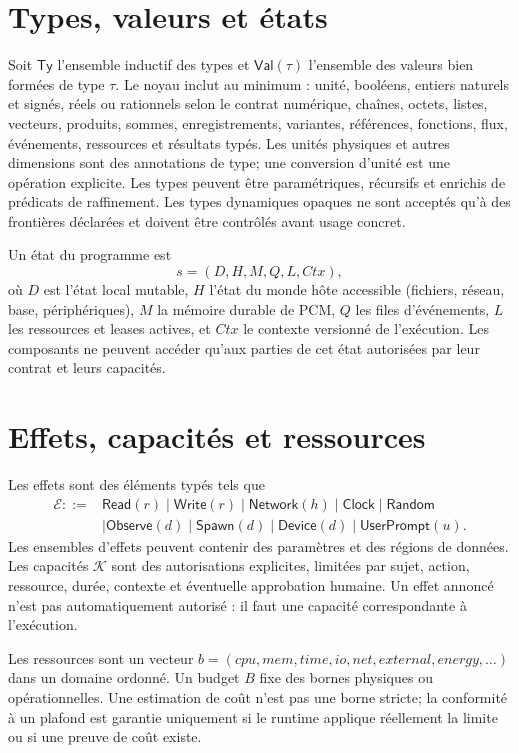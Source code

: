 \documentclass[11pt,a4paper,openany]{book}
\newcommand{\Eff}{\mathcal{E}}
\newcommand{\Capabilities}{\mathcal{K}}
\theoremstyle{definition}
\theoremstyle{plain}
\theoremstyle{remark}
\begin{document}
\section{Types, valeurs et états}
Soit $\mathsf{Ty}$ l'ensemble inductif des types et $\mathsf{Val}(\tau)$ l'ensemble des valeurs bien formées de type $\tau$. Le noyau inclut au minimum : unité, booléens, entiers naturels et signés, réels ou rationnels selon le contrat numérique, chaînes, octets, listes, vecteurs, produits, sommes, enregistrements, variantes, références, fonctions, flux, événements, ressources et résultats typés. Les unités physiques et autres dimensions sont des annotations de type; une conversion d'unité est une opération explicite. Les types peuvent être paramétriques, récursifs et enrichis de prédicats de raffinement. Les types dynamiques opaques ne sont acceptés qu'à des frontières déclarées et doivent être contrôlés avant usage concret.

Un état du programme est
\[
s=(D,H,M,Q,L,Ctx),
\]
où $D$ est l'état local mutable, $H$ l'état du monde hôte accessible (fichiers, réseau, base, périphériques), $M$ la mémoire durable de PCM, $Q$ les files d'événements, $L$ les ressources et leases actives, et $Ctx$ le contexte versionné de l'exécution. Les composants ne peuvent accéder qu'aux parties de cet état autorisées par leur contrat et leurs capacités.

\section{Effets, capacités et ressources}
Les effets sont des éléments typés tels que
\[\begin{aligned}
\Eff ::= {}&\mathsf{Read}(r)\mid\mathsf{Write}(r)\mid\mathsf{Network}(h)\mid\mathsf{Clock}\mid\mathsf{Random}\\
&\mid\mathsf{Observe}(d)\mid\mathsf{Spawn}(d)\mid\mathsf{Device}(d)\mid\mathsf{UserPrompt}(u).
\end{aligned}\]
Les ensembles d'effets peuvent contenir des paramètres et des régions de données. Les capacités $\Capabilities$ sont des autorisations explicites, limitées par sujet, action, ressource, durée, contexte et éventuelle approbation humaine. Un effet annoncé n'est pas automatiquement autorisé : il faut une capacité correspondante à l'exécution.

Les ressources sont un vecteur $b=(cpu,mem,time,io,net,external,energy,\ldots)$ dans un domaine ordonné. Un budget $B$ fixe des bornes physiques ou opérationnelles. Une estimation de coût n'est pas une borne stricte; la conformité à un plafond est garantie uniquement si le runtime applique réellement la limite ou si une preuve de coût existe.
\end{document}
